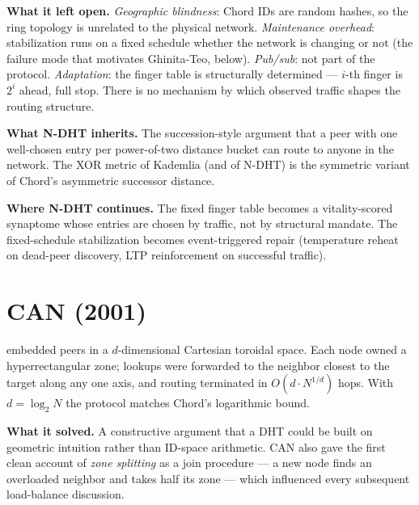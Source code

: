 \documentclass[twoside,nobib]{tufte-book}
\newcommand{\NDHT}{N-DHT\xspace}
\begin{document}
\textbf{What it left open.} \emph{Geographic blindness}: Chord IDs
are random hashes, so the ring topology is unrelated to the physical
network. \emph{Maintenance overhead}: stabilization runs on a fixed
schedule whether the network is changing or not (the failure mode
that motivates Ghinita-Teo, below). \emph{Pub/sub}: not part of the
protocol. \emph{Adaptation}: the finger table is structurally
determined --- $i$-th finger is $2^i$ ahead, full stop. There is no
mechanism by which observed traffic shapes the routing structure.

\textbf{What \NDHT inherits.} The succession-style argument that a
peer with one well-chosen entry per power-of-two distance bucket
can route to anyone in the network. The XOR metric of Kademlia (and
of \NDHT) is the symmetric variant of Chord's asymmetric successor
distance.

\textbf{Where \NDHT continues.} The fixed finger table becomes a
vitality-scored synaptome whose entries are chosen by traffic, not
by structural mandate. The fixed-schedule stabilization becomes
event-triggered repair (temperature reheat on dead-peer discovery,
LTP reinforcement on successful traffic).

\section{CAN (2001)}

embedded peers in a $d$-dimensional Cartesian
toroidal space. Each node owned a hyperrectangular
zone; lookups were forwarded to the neighbor closest to the target
along any one axis, and routing terminated in $O(d \cdot N^{1/d})$
hops. With $d = \log_2 N$ the protocol matches Chord's logarithmic
bound.

\textbf{What it solved.} A constructive argument that a DHT could be
built on geometric intuition rather than ID-space arithmetic. CAN
also gave the first clean account of \emph{zone splitting} as a
join procedure --- a new node finds an overloaded neighbor and
takes half its zone --- which influenced every subsequent
load-balance discussion.
\end{document}
